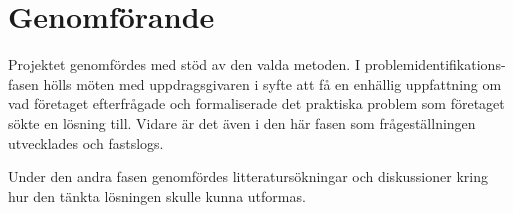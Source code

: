 \section{Genomförande} %
\label{sec:genomf_rande}

    Projektet genomfördes med stöd av den valda metoden. I problemidentifikations-fasen hölls möten med uppdragsgivaren i syfte att få en enhällig uppfattning om vad företaget efterfrågade och formaliserade det praktiska problem som företaget sökte en lösning till. Vidare är det även i den här fasen som frågeställningen utvecklades och fastslogs. \bigskip

    Under den andra fasen genomfördes litteratursökningar och diskussioner kring hur den tänkta lösningen skulle kunna utformas. 
